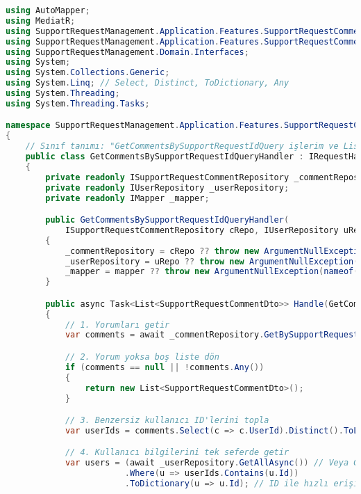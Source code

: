 \documentclass[11pt, a4paper]{article}
\begin{document}
\begin{lstlisting}[language=C#]
using AutoMapper;
using MediatR;
using SupportRequestManagement.Application.Features.SupportRequestComment.Dtos;
using SupportRequestManagement.Application.Features.SupportRequestComment.Queries;
using SupportRequestManagement.Domain.Interfaces;
using System;
using System.Collections.Generic;
using System.Linq; // Select, Distinct, ToDictionary, Any
using System.Threading;
using System.Threading.Tasks;

namespace SupportRequestManagement.Application.Features.SupportRequestComment.Handlers
{
    // Sınıf tanımı: "GetCommentsBySupportRequestIdQuery işlerim ve List<SupportRequestCommentDto> döndürürüm."
    public class GetCommentsBySupportRequestIdQueryHandler : IRequestHandler<GetCommentsBySupportRequestIdQuery, List<SupportRequestCommentDto>>
    {
        private readonly ISupportRequestCommentRepository _commentRepository;
        private readonly IUserRepository _userRepository;
        private readonly IMapper _mapper;

        public GetCommentsBySupportRequestIdQueryHandler(
            ISupportRequestCommentRepository cRepo, IUserRepository uRepo, IMapper mapper)
        {
            _commentRepository = cRepo ?? throw new ArgumentNullException(nameof(cRepo));
            _userRepository = uRepo ?? throw new ArgumentNullException(nameof(uRepo));
            _mapper = mapper ?? throw new ArgumentNullException(nameof(mapper));
        }

        public async Task<List<SupportRequestCommentDto>> Handle(GetCommentsBySupportRequestIdQuery request, CancellationToken ct)
        {
            // 1. Yorumları getir
            var comments = await _commentRepository.GetBySupportRequestIdAsync(request.SupportRequestId);

            // 2. Yorum yoksa boş liste dön
            if (comments == null || !comments.Any())
            {
                return new List<SupportRequestCommentDto>();
            }

            // 3. Benzersiz kullanıcı ID'lerini topla
            var userIds = comments.Select(c => c.UserId).Distinct().ToList();

            // 4. Kullanıcı bilgilerini tek seferde getir
            var users = (await _userRepository.GetAllAsync()) // Veya GetByIdsAsync varsa o kullanılır
                        .Where(u => userIds.Contains(u.Id))
                        .ToDictionary(u => u.Id); // ID ile hızlı erişim için


\end{lstlisting}
\end{document}
